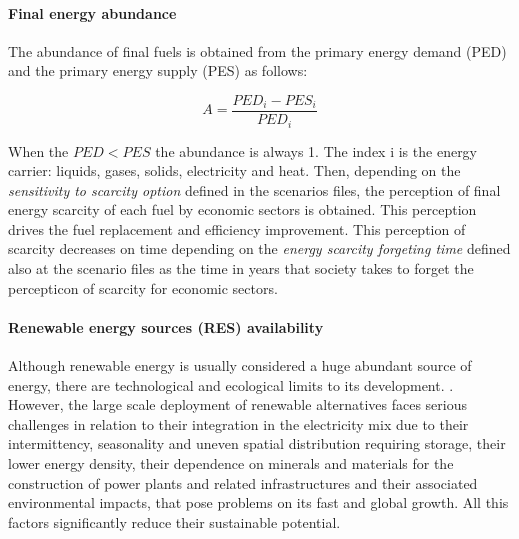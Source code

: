 
\paragraph{Final energy abundance}

The abundance of final fuels is obtained from the primary energy demand (PED) and the primary energy supply (PES) as follows:

\begin{equation}
A= \frac{PED_i-PES_i}{PED_i}
\label{eq:abundance-final-fuels}
\end{equation}

When the $PED<PES$ the abundance is always 1. The index i is the energy carrier: liquids, gases, solids, electricity and heat.
Then, depending on the \emph{sensitivity to scarcity option} defined in the scenarios files, the perception of final energy scarcity of each fuel by economic sectors is obtained. This perception drives the fuel replacement and efficiency improvement. This perception of scarcity decreases on time depending on the \emph{energy scarcity forgeting time} defined also at the scenario files as the time in years that society takes to forget the percepticon of scarcity for economic sectors.

\paragraph{Renewable energy sources (RES) availability}

Although renewable energy is usually considered a huge abundant source of energy, there are technological and ecological limits to its development. . However, the large scale deployment of renewable alternatives faces serious challenges in relation to their integration in the electricity mix due to their intermittency, seasonality and uneven spatial distribution requiring storage, their lower energy density, their dependence on minerals and materials for the construction of power plants and related infrastructures and their associated environmental impacts, that pose problems on its fast and global growth. All this factors significantly reduce their sustainable potential.
 


